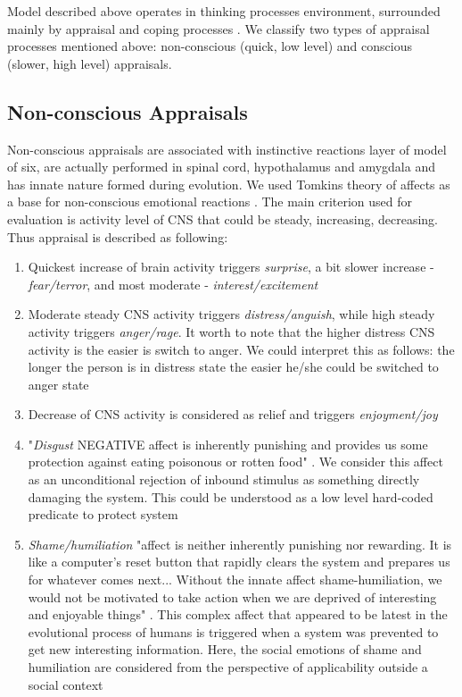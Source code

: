 Model described above operates in thinking processes environment, surrounded mainly by appraisal and coping processes \cite{dont_worry_be_happy}. We classify two types of appraisal processes mentioned above: non-conscious (quick, low level) and conscious (slower, high level) appraisals.

\subsection{Non-conscious Appraisals}

Non-conscious appraisals are associated with instinctive reactions layer of model of six, are actually performed in spinal cord, hypothalamus and amygdala and has innate nature formed during evolution. We used Tomkins theory of affects as a base for non-conscious emotional reactions \cite{primer_affect_psychology}. The main criterion used for evaluation is activity level of CNS that could be steady, increasing, decreasing. Thus appraisal is described as following:

\begin{enumerate}
 \item  Quickest increase of brain activity triggers \emph{surprise}, a bit slower increase - \emph{fear/terror}, and most moderate - \emph{interest/excitement}
 \item  Moderate steady CNS activity triggers \emph{distress/anguish}, while high steady activity triggers \emph{anger/rage}. It worth to note that the higher distress CNS activity is the easier is switch to anger. We could interpret this as follows: the longer the person is in distress state the easier he/she could be switched to anger state
 \item  Decrease of CNS activity is considered as relief and triggers \emph{enjoyment/joy}
 \item  "\emph{Disgust} NEGATIVE affect is inherently punishing and provides us some protection against eating poisonous or rotten food" \cite{primer_affect_psychology}. We consider this affect as an unconditional rejection of inbound stimulus as something directly damaging the system. This could be understood as a low level hard-coded predicate to protect system
 \item  \emph{Shame/humiliation} "affect is neither inherently punishing nor rewarding. It is like a computer’s reset button that rapidly clears the system and prepares us for whatever comes next... Without the innate affect shame-humiliation, we would not be motivated to take action when we are deprived of interesting and enjoyable things" \cite{primer_affect_psychology}. This complex affect that appeared to be latest in the evolutional process of humans is triggered when a system was prevented to get new interesting information. Here, the social emotions of shame and humiliation are considered from the perspective of applicability outside a social context
\end{enumerate}

